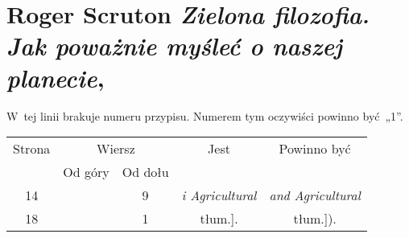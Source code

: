 \documentclass[a4paper,11pt]{article}
\numberwithin{equation}{section}
\begin{document}















\section{Roger Scruton \textit{Zielona filozofia. Jak
    poważnie myśleć o naszej planecie},
  \parencite{ScrutonZielonaFilozofia2017}}


\vspace{0em}



\vspace{0em}


\noindent
{} W~tej linii brakuje numeru przypisu. Numerem tym
oczywiści powinno być~„1”.

\VerSpaceFour





\newpage



\begin{center}

  \begin{tabular}{|c|c|c|c|c|}
    \hline
    Strona & \multicolumn{2}{c|}{Wiersz} & Jest
                              & Powinno być \\ \cline{2-3}
    & Od góry & Od dołu & & \\
    \hline
    14 & &  9 & \textit{i Agricultural} & \textit{and Agricultural} \\
    18 & &  1 & tłum.]. & tłum.]). \\
    \hline
  \end{tabular}

\end{center}
\end{document}
